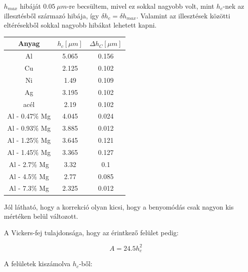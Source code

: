 \documentclass[a4paper,12pt]{article}
\begin{document}
\par $h_{max}$ hibáját $0.05 ~\mu m$-re becsültem, mivel ez sokkal nagyobb volt, mint $h_{c}$-nek az illesztésből származó hibája, így $\delta h_{c} = \delta h_{max}$. Valamint az illesztések közötti eltérésekből sokkal nagyobb hibákat lehetett kapni.

\begin{center}
\begin{tabular}{|c|c|c|}
\hline
Anyag & $h_{c} [\mu m]$ & $\Delta h_{C} [\mu m]$ \\
\hline
Al& 5.065& 0.156\\
\hline
Cu &2.125 &0.102\\
\hline
Ni &1.49& 0.109\\
\hline
Ag &3.195 &0.102\\
\hline
acél &2.19& 0.102\\
\hline
Al - 0.47$\%$ Mg& 4.045& 0.024\\
\hline
Al - 0.93$\%$ Mg &3.885 &0.012\\
\hline
Al - 1.25$\%$ Mg & 3.645 &0.121\\
\hline
Al - 1.45$\%$ Mg & 3.365 &0.127\\
\hline
Al - 2.7$\%$ Mg& 3.32 &0.1\\
\hline
Al - 4.5$\%$ Mg& 2.77 &0.085\\
\hline
Al - 7.3$\%$ Mg& 2.325& 0.012\\
\hline
\end{tabular}
\end{center}

\par Jól látható, hogy a korrekció olyan kicsi, hogy a benyomódás csak nagyon kis mértéken belül változott.

\par A Vickers-fej tulajdonsága, hogy az érintkező felület pedig:

\begin{equation*}
A = 24.5h_{c}^{2}
\end{equation*}

\par A felületek kiszámolva $h_{c}$-ből:
\end{document}
